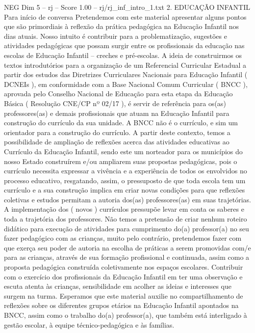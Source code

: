 \begin{textsample}{NEG Dim 5 – rj – Score 1.00 – rj/rj\_inf\_intro\_1.txt}  \label{ex:f5_neg_094}
2.
EDUCAÇÃO INFANTIL Para início de conversa Pretendemos com este material apresentar alguns pontos que são primordiais à reflexão da prática pedagógica na Educação Infantil nos dias atuais.
Nosso intuito é contribuir para a problematização, sugestões e atividades pedagógicas que possam surgir entre os profissionais da educação nas escolas de Educação Infantil – creches e pré-escolas.
A ideia de construirmos os textos introdutórios para a organização de um Referencial Curricular Estadual a partir dos estudos das Diretrizes Curriculares Nacionais para Educação Infantil ( DCNEIs ), em conformidade com a Base Nacional Comum Curricular ( BNCC ), aprovada pelo Conselho Nacional de Educação para esta etapa da Educação Básica ( Resolução CNE/CP nº 02/17 ), é servir de referência para os(as) professores(as) e demais profissionais que atuam na Educação Infantil para construção do currículo da sua unidade.
A BNCC não é o currículo, e sim um orientador para a construção do currículo.
A partir deste contexto, temos a possibilidade de ampliação de reflexões acerca das atividades educativas ao Currículo da Educação Infantil, sendo este um norteador para os municípios do nosso Estado construírem e/ou ampliarem suas propostas pedagógicas, pois o currículo necessita expressar a vivência e a experiência de todos os envolvidos no processo educativo, resgatando, assim, o pressuposto de que toda escola tem um currículo e a sua construção implica em criar novas condições para que reflexões coletivas e estudos permitam a autoria dos(as) professores(as) em suas trajetórias.
A implementação dos ( novos ) currículos pressupõe levar em conta os saberes e toda a trajetória dos professores.
Não temos a pretensão de criar nenhum roteiro didático para execução de atividades para cumprimento do(a) professor(a) no seu fazer pedagógico com as crianças, muito pelo contrário, pretendemos fazer com que exerça seu poder de autoria na escolha de práticas a serem promovidas com/e para as crianças, através de sua formação profissional e continuada, assim como a proposta pedagógica construída coletivamente nos espaços escolares.
Contribuir com o exercício dos profissionais da Educação Infantil em ter uma observação e escuta atenta às crianças, sensibilidade em acolher as ideias e interesses que surgem na turma.
Esperamos que este material auxilie no compartilhamento de reflexões sobre os diferentes grupos etários na Educação Infantil apontados na BNCC, assim como o trabalho do(a) professor(a), que também está interligado à gestão escolar, à equipe técnico-pedagógica e às famílias.

\end{textsample}
